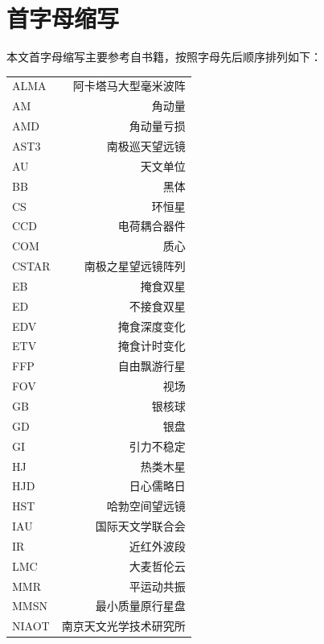 \section{首字母缩写}  \label{apdx:acronym}
本文首字母缩写主要参考自书籍，按照字母先后顺序排列如下：
\begin{multicols}{2}
\begin{tabularx}{0.85\linewidth}{@{\extracolsep{\fill}}lr}
\centering
ALMA		&   阿卡塔马大型毫米波阵		\\ 
AM			&   角动量					\\ 
AMD			&   角动量亏损				\\ 
AST3		&   南极巡天望远镜			\\  
AU			&   天文单位				\\
BB			&   黑体					\\
CS 			&   环恒星					\\
CCD			&   电荷耦合器件			\\
COM			&   质心					\\
CSTAR		&   南极之星望远镜阵列		\\  
EB			&   掩食双星				\\ 
ED			&   不接食双星				\\ 
EDV			&   掩食深度变化			\\
ETV			&   掩食计时变化			\\
FFP			&   自由飘游行星			\\ 
FOV			&   视场					\\ 
GB			&   银核球					\\
GD			&   银盘					\\
GI			&   引力不稳定				\\
HJ			&   热类木星				\\
HJD			&   日心儒略日				\\
HST			&   哈勃空间望远镜			\\
IAU			&   国际天文学联合会		\\
IR			&   近红外波段				\\
LMC			&   大麦哲伦云				\\
MMR		&   平运动共振				\\   
MMSN		&   最小质量原行星盘		\\
NIAOT		&   南京天文光学技术研究所	\\


\end{tabularx}
\columnbreak


\end{multicols}
